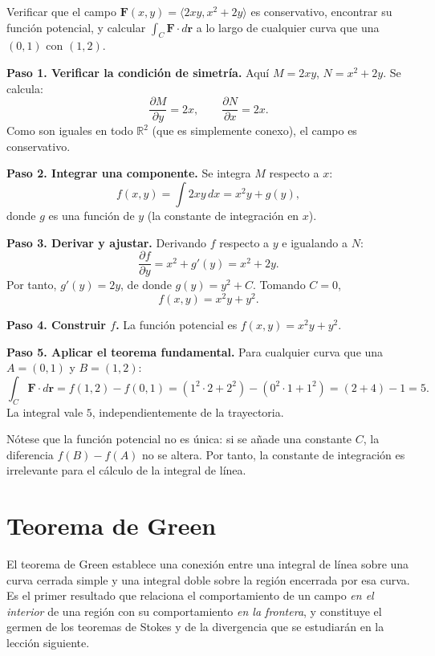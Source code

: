 \begin{example}
Verificar que el campo $\mathbf{F}(x,y) = \langle 2xy, x^2 + 2y \rangle$
es conservativo, encontrar su función potencial, y calcular
$\int_C \mathbf{F}\cdot d\mathbf{r}$ a lo largo de cualquier curva que
una $(0,1)$ con $(1,2)$.
\begin{myproof}
\textbf{Paso 1. Verificar la condición de simetría.}
Aquí $M=2xy$, $N=x^2+2y$. Se calcula:
\[
\frac{\partial M}{\partial y} = 2x, \qquad
\frac{\partial N}{\partial x} = 2x.
\]
Como son iguales en todo $\mathbb{R}^2$ (que es simplemente conexo),
el campo es conservativo.

\textbf{Paso 2. Integrar una componente.}
Se integra $M$ respecto a $x$:
\[
f(x,y) = \int 2xy \, dx = x^2 y + g(y),
\]
donde $g$ es una función de $y$ (la constante de integración en $x$).

\textbf{Paso 3. Derivar y ajustar.}
Derivando $f$ respecto a $y$ e igualando a $N$:
\[
\frac{\partial f}{\partial y} = x^2 + g'(y) = x^2 + 2y.
\]
Por tanto, $g'(y) = 2y$, de donde $g(y) = y^2 + C$. Tomando $C=0$,
\[
f(x,y) = x^2 y + y^2.
\]

\textbf{Paso 4. Construir $f$.}
La función potencial es $f(x,y)=x^2 y + y^2$.

\textbf{Paso 5. Aplicar el teorema fundamental.}
Para cualquier curva que una $A=(0,1)$ y $B=(1,2)$:
\[
\int_C \mathbf{F}\cdot d\mathbf{r}
= f(1,2) - f(0,1)
= (1^2\cdot 2 + 2^2) - (0^2\cdot 1 + 1^2)
= (2+4) - 1 = 5.
\]
La integral vale $\boxed{5}$, independientemente de la trayectoria.
\end{myproof}
\end{example}

\begin{rem}
Nótese que la función potencial no es única: si se añade una constante
$C$, la diferencia $f(B)-f(A)$ no se altera. Por tanto, la constante
de integración es irrelevante para el cálculo de la integral de línea.
\end{rem}

\section{Teorema de Green}

El teorema de Green establece una conexión entre una integral de línea
sobre una curva cerrada simple y una integral doble sobre la región
encerrada por esa curva. Es el primer resultado que relaciona el
comportamiento de un campo \emph{en el interior} de una región con su
comportamiento \emph{en la frontera}, y constituye el germen de los
teoremas de Stokes y de la divergencia que se estudiarán en la lección
siguiente.

